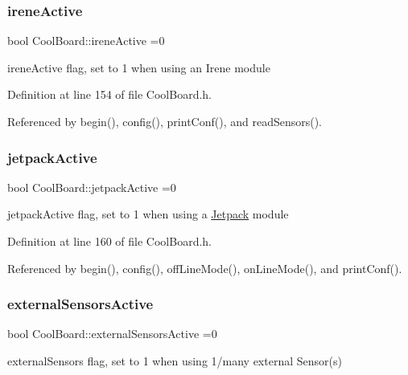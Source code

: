 \subsubsection{\texorpdfstring{irene\+Active}{ireneActive}}
{\footnotesize\ttfamily bool Cool\+Board\+::irene\+Active =0\hspace{0.3cm}{\ttfamily [private]}}

irene\+Active flag, set to 1 when using an Irene module 

Definition at line 154 of file Cool\+Board.\+h.



Referenced by begin(), config(), print\+Conf(), and read\+Sensors().

\mbox{\label{class_cool_board_a9be03a913d26e558328935ca3b59a75e}} 
\subsubsection{\texorpdfstring{jetpack\+Active}{jetpackActive}}
{\footnotesize\ttfamily bool Cool\+Board\+::jetpack\+Active =0\hspace{0.3cm}{\ttfamily [private]}}

jetpack\+Active flag, set to 1 when using a \hyperlink{class_jetpack}{Jetpack} module 

Definition at line 160 of file Cool\+Board.\+h.



Referenced by begin(), config(), off\+Line\+Mode(), on\+Line\+Mode(), and print\+Conf().

\mbox{\label{class_cool_board_a638b00b76aeb819ecfd4c10b8cdd7bb7}} 
\subsubsection{\texorpdfstring{external\+Sensors\+Active}{externalSensorsActive}}
{\footnotesize\ttfamily bool Cool\+Board\+::external\+Sensors\+Active =0\hspace{0.3cm}{\ttfamily [private]}}

external\+Sensors flag, set to 1 when using 1/many external Sensor(s) 

